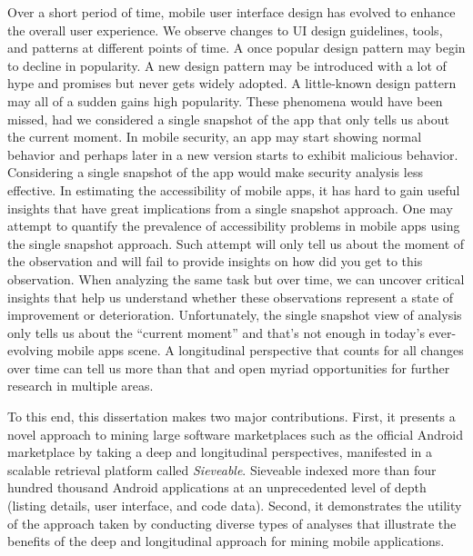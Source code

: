 Over a short period of time, mobile user interface design has evolved to enhance the overall user experience.
We observe changes to UI design guidelines, tools, and patterns at different points of time.
A once popular design pattern may begin to decline in popularity.
A new design pattern may be introduced with a lot of hype and promises but never gets widely adopted.
A little-known design pattern may all of a sudden gains high popularity.
These phenomena would have been missed, had we considered a single snapshot of the app that only tells us about the current moment.
In mobile security, an app may start showing normal behavior and perhaps later in a new version starts to exhibit malicious behavior.
Considering a single snapshot of the app would make security analysis less effective.
In estimating the accessibility of mobile apps, it has hard to gain useful insights that have great implications from a single snapshot approach.
One may attempt to quantify the prevalence of accessibility problems in mobile apps using the single snapshot approach.
Such attempt will only tell us about the moment of the observation and will fail to provide insights on how did you get to this observation.
When analyzing the same task but over time, we can uncover critical insights that help us understand whether these observations represent a state of improvement or deterioration.
Unfortunately, the single snapshot view of analysis only tells us about the ``current moment'' and that's not enough in today's ever-evolving mobile apps scene.
A longitudinal perspective that counts for all changes over time can tell us more than that and open myriad opportunities for further research in multiple areas.

To this end, this dissertation makes two major contributions.
First, it presents a novel approach to mining large software marketplaces such as the official Android marketplace by taking a deep and longitudinal perspectives, manifested in a scalable retrieval platform called \textit{Sieveable}.
Sieveable indexed more than four hundred thousand Android applications at an unprecedented level of depth (listing details, user interface, and code data).
Second, it demonstrates the utility of the approach taken by conducting diverse types of analyses that illustrate the benefits of the deep and longitudinal approach for mining mobile applications.

